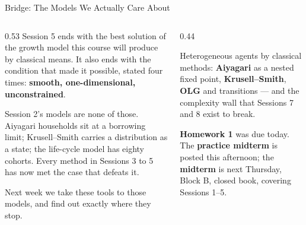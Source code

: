 \begin{frame}{Bridge: The Models We Actually Care About}
\begin{columns}[T]
\begin{column}{0.53\textwidth}
\small
Session 5 ends with the best solution of the growth model this course will produce by classical means. It also ends with the condition that made it possible, stated four times: \textbf{smooth, one-dimensional, unconstrained}.
\medskip

Session 2's models are none of those. Aiyagari households sit at a borrowing limit; Krusell--Smith carries a distribution as a state; the life-cycle model has eighty cohorts. Every method in Sessions 3 to 5 has now met the case that defeats it.
\medskip

Next week we take these tools to those models, and find out exactly where they stop.
\end{column}
\begin{column}{0.44\textwidth}
\begin{conceptbox}[title=\textbf{Next week (S6)}]\small
Heterogeneous agents by classical methods: \textbf{Aiyagari} as a nested fixed point, \textbf{Krusell--Smith}, \textbf{OLG} and transitions --- and the complexity wall that Sessions 7 and 8 exist to break.
\end{conceptbox}
\medskip
\begin{examplebox}\footnotesize
\textbf{Homework 1} was due today. The \textbf{practice midterm} is posted this afternoon; the \textbf{midterm} is next Thursday, Block B, closed book, covering Sessions 1--5.
\end{examplebox}
\end{column}
\end{columns}
\end{frame}


